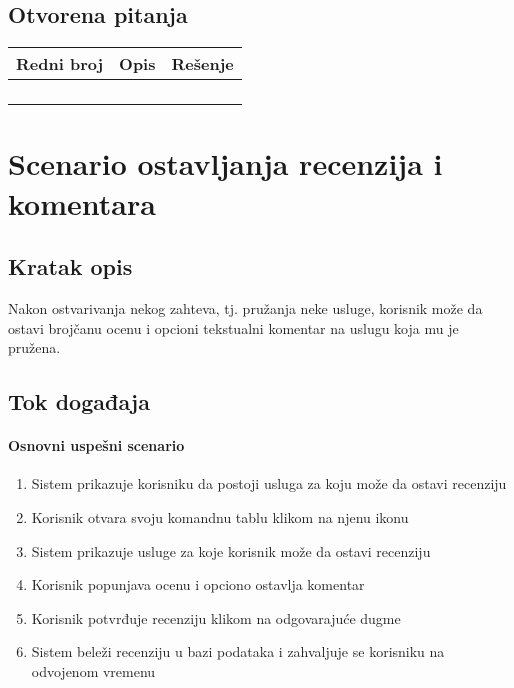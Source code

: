 \documentclass[a4paper,12pt]{report}
\newcommand{\genitivfunkcionalnosti}{ostavljanja recenzija i komentara}
\begin{document}
		\subsection{Otvorena pitanja}
			\begin{tabular}{ |c|p{10cm}|l| }
				\hline
				\textbf{Redni broj} & \textbf{Opis} & \textbf{Rešenje} \\ 
				\hline
			    & &  \\
				\hline
			    &  & \\
				\hline
				&  & \\
				\hline
				&  & \\
				\hline
			\end{tabular}
	\section{Scenario \genitivfunkcionalnosti}
		\subsection{Kratak opis}
			Nakon ostvarivanja nekog zahteva, tj. pružanja neke usluge, korisnik može da ostavi brojčanu ocenu i opcioni tekstualni komentar na uslugu koja mu je pružena.
		\newpage
		\subsection{Tok događaja}
			\paragraph*{Osnovni uspešni scenario}
				\begin{enumerate}
					\item Sistem prikazuje korisniku da postoji usluga za koju može da ostavi recenziju
					\item Korisnik otvara svoju komandnu tablu klikom na njenu ikonu
					\item Sistem prikazuje usluge za koje korisnik može da ostavi recenziju
					\item Korisnik popunjava ocenu i opciono ostavlja komentar
					\item Korisnik potvrđuje recenziju klikom na odgovarajuće dugme
					\item Sistem beleži recenziju u bazi podataka i zahvaljuje se korisniku na odvojenom vremenu
				\end{enumerate}
\end{document}
